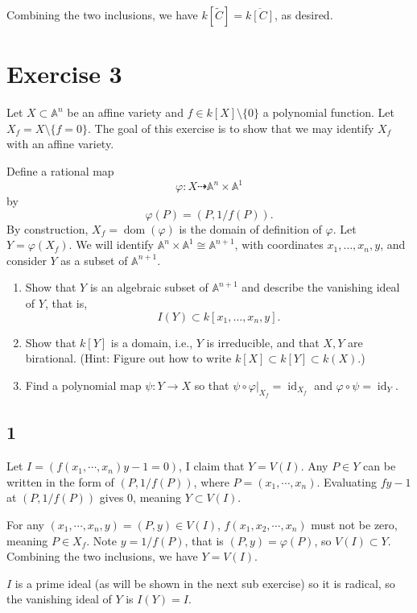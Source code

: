 \documentclass{article}
\theoremstyle{definition}
\theoremstyle{definition}
\theoremstyle{remark}
\begin{document}
Combining the two inclusions, we have $k[\tilde{C}] = \overline{k[C]}$, as desired.

\section*{Exercise 3}
Let $X \subset \mathbb{A}^n$ be an affine variety and $f \in k[X] \setminus \{0\}$ a polynomial function. Let $X_f = X \setminus \{f = 0\}$. The goal of this exercise is to show that we may identify $X_f$ with an affine variety.

Define a rational map
\[
    \varphi: X \dashrightarrow \mathbb{A}^n \times \mathbb{A}^1
\]
by
\[
    \varphi(P) = (P, 1/f(P)).
\]
By construction, $X_f = \operatorname{dom}(\varphi)$ is the domain of definition of $\varphi$. Let $Y = \varphi(X_f)$. We will identify $\mathbb{A}^n \times \mathbb{A}^1 \cong \mathbb{A}^{n+1}$, with coordinates $x_1, \dots, x_n, y$, and consider $Y$ as a subset of $\mathbb{A}^{n+1}$.

\begin{enumerate}
    \item Show that $Y$ is an algebraic subset of $\mathbb{A}^{n+1}$ and describe the vanishing ideal of $Y$, that is,
    \[
        I(Y) \subset k[x_1, \dots, x_n, y].
    \]
    \item Show that $k[Y]$ is a domain, i.e., $Y$ is irreducible, and that $X, Y$ are birational. (Hint: Figure out how to write $k[X] \subset k[Y] \subset k(X)$.)
    \item Find a polynomial map $\psi: Y \to X$ so that $\psi \circ \varphi|_{X_f} = \operatorname{id}_{X_f}$ and $\varphi \circ \psi = \operatorname{id}_Y$.
\end{enumerate}

\subsection*{1}
Let $I = (f(x_1, \cdots, x_n)y - 1 = 0)$, I claim that $Y = V(I)$.
Any $P \in Y$ can be written in the form of $(P, 1/f(P))$, where $P = (x_1, \cdots, x_n)$.
Evaluating $fy -1$ at $(P, 1/f(P))$ gives $0$, meaning $Y \subset V(I)$. 

For any $(x_1, \cdots, x_n, y) = (P, y) \in V(I)$, $f(x_1, x_2, \cdots, x_n)$ must not be zero, meaning $P \in X_f$. 
Note $y = 1 /f(P)$, that is $(P, y) = \varphi(P)$, so $V(I) \subset Y$. 
Combining the two inclusions, we have $Y = V(I)$.

$I$ is a prime ideal (as will be shown in the next sub exercise) so it is radical, so the vanishing ideal of $Y$ is $I(Y) = I$.
\end{document}
